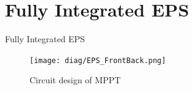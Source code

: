 \documentclass[aspectratio=169]{beamer}
\begin{document}
	\section{Fully Integrated EPS}	
				\begin{frame}{Fully Integrated EPS}
			\begin{figure}[h]
				\centering
				\texttt{[image: diag/EPS\_FrontBack.png]}
				\caption{Circuit design of MPPT}
				\label{fig:meshn}
			\end{figure}
		\end{frame}
			

%		
%
%
%
%		
%
%		
%
%	
%
%
\end{document}
